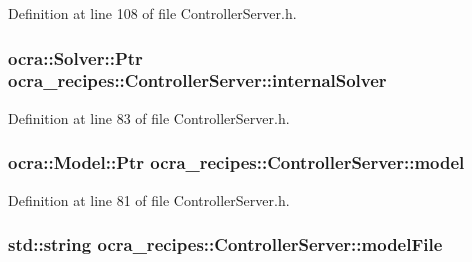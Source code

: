 Definition at line 108 of file Controller\+Server.\+h.

\subsubsection[{\texorpdfstring{internal\+Solver}{internalSolver}}]{\setlength{\rightskip}{0pt plus 5cm}ocra\+::\+Solver\+::\+Ptr ocra\+\_\+recipes\+::\+Controller\+Server\+::internal\+Solver\hspace{0.3cm}{\ttfamily [protected]}}\hypertarget{classocra__recipes_1_1ControllerServer_a46e53b5a5bf9f7d55af477f85cb21522}{}\label{classocra__recipes_1_1ControllerServer_a46e53b5a5bf9f7d55af477f85cb21522}


Definition at line 83 of file Controller\+Server.\+h.

\subsubsection[{\texorpdfstring{model}{model}}]{\setlength{\rightskip}{0pt plus 5cm}ocra\+::\+Model\+::\+Ptr ocra\+\_\+recipes\+::\+Controller\+Server\+::model\hspace{0.3cm}{\ttfamily [protected]}}\hypertarget{classocra__recipes_1_1ControllerServer_ab239e92da81b48afa2211ef9b25672f3}{}\label{classocra__recipes_1_1ControllerServer_ab239e92da81b48afa2211ef9b25672f3}


Definition at line 81 of file Controller\+Server.\+h.

\subsubsection[{\texorpdfstring{model\+File}{modelFile}}]{\setlength{\rightskip}{0pt plus 5cm}std\+::string ocra\+\_\+recipes\+::\+Controller\+Server\+::model\+File\hspace{0.3cm}{\ttfamily [protected]}}\hypertarget{classocra__recipes_1_1ControllerServer_ab077706b924eed4ac5c50e9ade36acf4}{}\label{classocra__recipes_1_1ControllerServer_ab077706b924eed4ac5c50e9ade36acf4}


